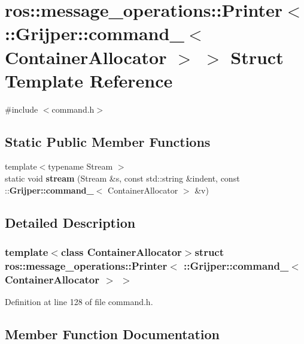 \section{ros\-:\-:message\-\_\-operations\-:\-:Printer$<$ \-:\-:Grijper\-:\-:command\-\_\-$<$ Container\-Allocator $>$ $>$ Struct Template Reference}
\label{structros_1_1message__operations_1_1Printer_3_01_1_1Grijper_1_1command___3_01ContainerAllocator_01_4_01_4}


{\ttfamily \#include $<$command.\-h$>$}

\subsection*{Static Public Member Functions}
\begin{DoxyCompactItemize}
\item 
{\footnotesize template$<$typename Stream $>$ }\\static void {\bf stream} (Stream \&s, const std\-::string \&indent, const \-::{\bf Grijper\-::command\-\_\-}$<$ Container\-Allocator $>$ \&v)
\end{DoxyCompactItemize}


\subsection{Detailed Description}
\subsubsection*{template$<$class Container\-Allocator$>$struct ros\-::message\-\_\-operations\-::\-Printer$<$ \-::\-Grijper\-::command\-\_\-$<$ Container\-Allocator $>$ $>$}



Definition at line 128 of file command.\-h.



\subsection{Member Function Documentation}
